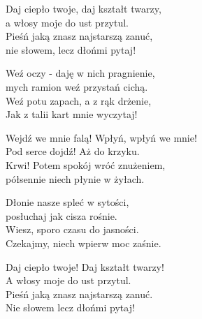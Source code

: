 \begin{text}
    Daj ciepło twoje, daj kształt twarzy,\\
    a włosy moje do ust przytul.\\
    Pieśń jaką znasz najstarszą zanuć,\\
    nie słowem, lecz dłońmi pytaj!

    Weź oczy - daję w nich pragnienie,\\
    mych ramion weź przystań cichą.\\
    Weź potu zapach, a z rąk drżenie,\\
    Jak z talii kart mnie wyczytaj!

    Wejdź we mnie falą! Wpłyń, wpłyń we mnie!\\
    Pod serce dojdź! Aż do krzyku.\\
    Krwi! Potem spokój wróć znużeniem,\\
    półsennie niech płynie w żyłach.

    Dłonie nasze spleć w sytości,\\
    posłuchaj jak cisza rośnie.\\
    Wiesz, sporo czasu do jasności.\\
    Czekajmy, niech wpierw moc zaśnie.

    Daj ciepło twoje! Daj kształt twarzy!\\
    A włosy moje do ust przytul.\\
    Pieśń jaką znasz najstarszą zanuć.\\
    Nie słowem lecz dłońmi pytaj!
\end{text}

